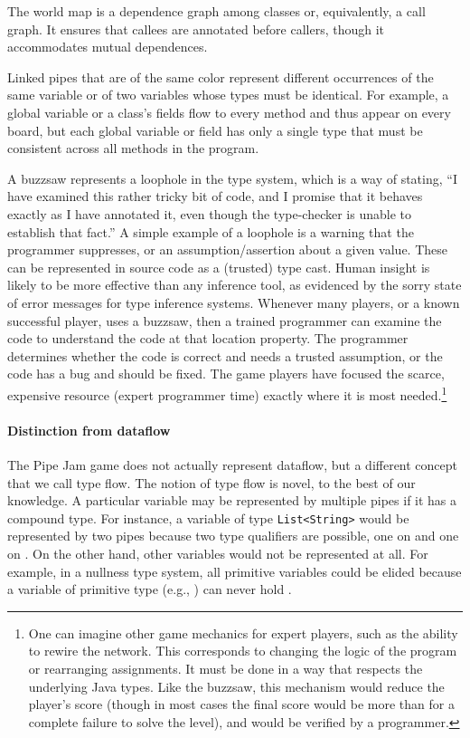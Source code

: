 \documentclass[preprint]{sig-alternate}
\def\<#1>{\codeid{#1}}
\newcommand{\codeid}[1]{\ifmmode{\mbox{\ttfamily{#1}}}\else{\ttfamily #1}\fi}
\begin{document}
The world map is a dependence graph among classes or, equivalently, a
call graph.  It ensures that callees are annotated before callers,
though it accommodates mutual dependences.

Linked pipes that are of the same color represent different
occurrences of the same variable or of two variables whose types must
be identical.  For example, a global variable or a class's fields flow
to every method and thus appear on every board, but each global
variable or field has only a single type that must be consistent
across all methods in the program.

A buzzsaw represents a loophole in the type system, which is a way of
stating, ``I have examined this rather tricky bit of code, and I
promise that it behaves exactly as I have annotated it, even though
the type-checker is unable to establish that fact.''  A simple example
of a loophole is a warning that the programmer suppresses, or an
assumption/assertion about a given value.  These can be represented in
source code as a (trusted) type cast.  Human insight is likely to be
more effective than any inference tool, as evidenced by the sorry
state of error messages for type inference systems.  Whenever many
players, or a known successful player, uses a buzzsaw, then a trained
programmer can examine the code to understand the code at that
location property.  The programmer determines whether the code is
correct and needs a trusted assumption, or the code has a bug and
should be fixed.  The game players have focused the scarce, expensive
resource (expert programmer time) exactly where it is most
needed.\footnote{One can imagine other game mechanics for expert
  players, such as the ability to rewire the network.  This
  corresponds to changing the logic of the program or rearranging
  assignments.  It must be done in a way that respects the underlying
  Java types.  Like the buzzsaw, this mechanism would reduce the
  player's score (though in most cases the final score would be more
  than for a complete failure to solve the level), and would be
  verified by a programmer.}


\paragraph{Distinction from dataflow}
The Pipe Jam game does not actually represent dataflow, but a
different concept that we call type flow.  The notion of type flow is
novel, to the best of our knowledge.  A particular variable may be
represented by multiple pipes if it has a compound type.  For
instance, a variable of type \verb|List<String>| would be represented
by two pipes because two type qualifiers are possible, one on \<List>
and one on \<String>.  On the other hand, other variables would not be
represented at all.  For example, in a nullness type system, all
primitive variables could be elided because a variable of primitive
type (e.g., \<int>) can never hold \<null>.
\end{document}
